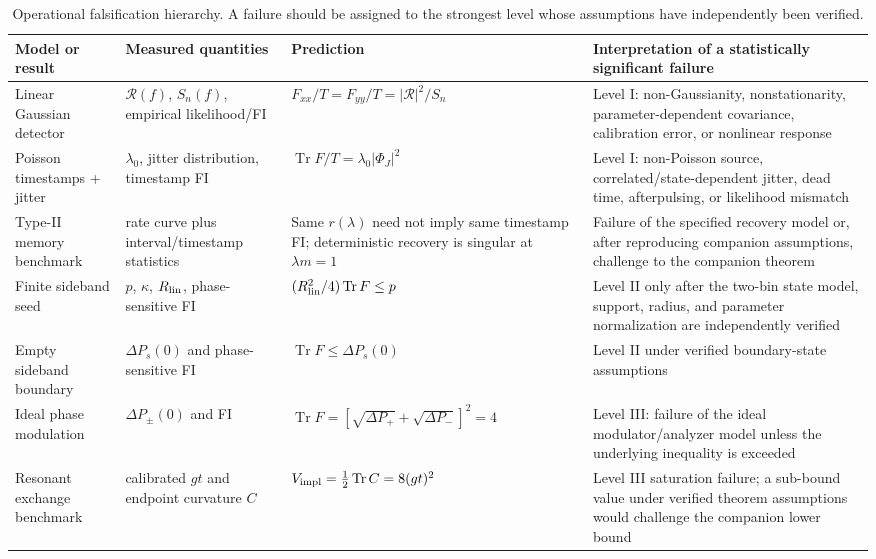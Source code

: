 \documentclass[aps,pra,reprint,superscriptaddress,longbibliography]{revtex4-2}
\newcommand{\Tr}{\operatorname{Tr}}
\begin{document}
\begin{table}[t]
\caption{Operational falsification hierarchy. A failure should be assigned to the strongest level whose assumptions have independently been verified.}
\label{tab:falsification}
\begin{ruledtabular}
\begin{tabular}{p{}p{}p{}p{}}
Model or result & Measured quantities & Prediction & Interpretation of a statistically significant failure \\
\hline
Linear Gaussian detector & $\mathcal R(f)$, $S_n(f)$, empirical likelihood/FI & $F_{xx}/T=F_{yy}/T=|\mathcal R|^2/S_n$ & Level I: non-Gaussianity, nonstationarity, parameter-dependent covariance, calibration error, or nonlinear response \\
Poisson timestamps + jitter & $\lambda_0$, jitter distribution, timestamp FI & $\Tr F/T=\lambda_0|\Phi_J|^2$ & Level I: non-Poisson source, correlated/state-dependent jitter, dead time, afterpulsing, or likelihood mismatch \\
Type-II memory benchmark & rate curve plus interval/timestamp statistics & Same $r(\lambda)$ need not imply same timestamp FI; deterministic recovery is singular at $\lambda m=1$ & Failure of the specified recovery model or, after reproducing companion assumptions, challenge to the companion theorem \\
Finite sideband seed & $p$, $\kappa$, $R_{\rm lin}$, phase-sensitive FI & $(R_{\rm lin}^2/4)\Tr F\le p$ & Level II only after the two-bin state model, support, radius, and parameter normalization are independently verified \\
Empty sideband boundary & $\Delta P_s(0)$ and phase-sensitive FI & $\Tr F\le\Delta P_s(0)$ & Level II under verified boundary-state assumptions \\
Ideal phase modulation & $\Delta P_\pm(0)$ and FI & $\Tr F=[\sqrt{\Delta P_+}+\sqrt{\Delta P_-}]^2=4$ & Level III: failure of the ideal modulator/analyzer model unless the underlying inequality is exceeded \\
Resonant exchange benchmark & calibrated $gt$ and endpoint curvature $C$ & $V_{\rm impl}=\tfrac12\Tr C=8(gt)^2$ & Level III saturation failure; a sub-bound value under verified theorem assumptions would challenge the companion lower bound \\
\end{tabular}
\end{ruledtabular}
\end{table}
\end{document}
